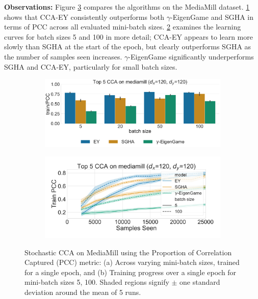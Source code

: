 \textbf{Observations:}
Figure \ref{fig:scca_mediamill} compares the algorithms on the MediaMill dataset. \cref{fig:corr_mediamill} shows that CCA-EY consistently outperforms both $\gamma$-EigenGame and SGHA in terms of PCC across all evaluated mini-batch sizes.
\cref{fig:lr_mediamill} examines the learning curves for batch sizes 5 and 100 in more detail; CCA-EY appears to learn more slowly than SGHA at the start of the epoch, but clearly outperforms SGHA as the number of samples seen increases. $\gamma$-EigenGame significantly underperforms SGHA and CCA-EY, particularly for small batch sizes.

\begin{figure}
    \centering
    \begin{subfigure}[b]{0.49\textwidth}
        \centering
        \includegraphics[width=\textwidth]{figures/CCA/mediamill_models_different_batch_sizes}
        \caption{}
        \label{fig:corr_mediamill}
    \end{subfigure}
    \hfill
    \begin{subfigure}[b]{0.49\textwidth}
        \centering
        \includegraphics[width=\textwidth]{figures/CCA/mediamill_allbatchsizes_pcc}
        \caption{}
        \label{fig:lr_mediamill}
    \end{subfigure}
    \caption{Stochastic CCA on MediaMill using the Proportion of Correlation Captured (PCC) metric: (a) Across varying mini-batch sizes, trained for a single epoch, and (b) Training progress over a single epoch for mini-batch sizes 5, 100.
    Shaded regions signify \(\pm\) one standard deviation around the mean of 5 runs.}\label{fig:scca_mediamill}
\end{figure}

